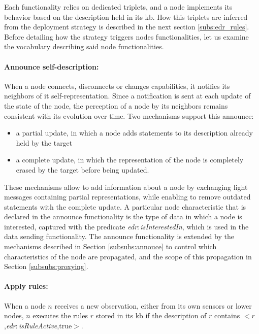 \documentclass{iosart2c}
\newcommand{\namespace}[1]{\textit{#1$:$}}
\newcommand{\concept}[2]{\namespace{#1}\-\textit{#2}}
\newcommand{\triplet}[3]{$<$#1,\textit{#2},#3$>$}
\begin{document}
Each functionality relies on dedicated triplets, and a node implements its behavior based on the description held in its \gls{kb}.
How this triplets are inferred from the deployment strategy is described in the next section \textsection \ref{subs:edr_rules}.
Before detailing how the strategy triggers nodes functionalities, let us examine the vocabulary describing said node functionalities.

\paragraph{Announce self-description:}
When a node connects, disconnects or changes capabilities, it notifies its neighbors of it self-representation.
Since a notification is sent at each update of the state of the node, the perception of a node by its neighbors remains consistent with its evolution over time.
Two mechanisms support this announce: 
\begin{itemize}
	\item a partial update, in which a node adds statements to its description already held by the target
	\item a complete update, in which the representation of the node is completely erased by the target before being updated.
\end{itemize}
These mechanisms allow to add information about a node by exchanging light messages containing partial representations, while enabling to remove outdated statements with the complete update. 
A particular node characteristic that is declared in the announce functionality is the type of data in which a node is interested, captured with the predicate \concept{edr}{is\-Interested\-In}, which is used in the data sending functionality.
The announce functionality is extended by the mechanisms described in Section \textsection \ref{subsubs:annouce} to control which characteristics of the node are propagated, and the scope of this propagation in Section \textsection \ref{subsubs:proxying}.

\paragraph{Apply rules:}
When a node $n$ receives a new observation, either from its own sensors or lower nodes, $n$ executes the rules $r$ stored in its \gls{kb} if the description of $r$ contains \triplet{$r$}{\concept{edr}{is\-Rule\-Active}}{true}.
\end{document}
